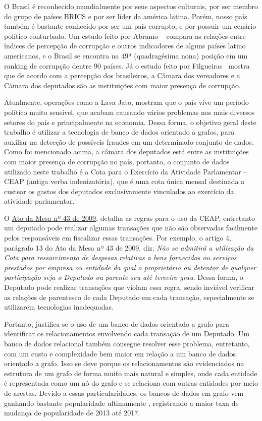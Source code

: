 	
	O Brasil é reconhecido mundialmente por seus aspectos culturais, por ser membro do grupo de países BRICS e por ser líder da américa latina. Porém, nosso país também é bastante conhecido por ser um país corrupto, e por possuir um cenário político conturbado. Um estudo feito por Abramo ~\cite{abramo2000relaccoes} compara as relações entre índices de percepção de corrupção e outros indicadores de alguns países latino americanos, e o Brasil se encontra na 49ª (quadragésima nona) posição em um ranking de corrupção dentre 90 países. Já o estudo feito por Filgueiras~\cite{filgueiras2009tolerancia} mostra que de acordo com a percepção dos brasileiros, a Câmara dos vereadores e a Câmara dos deputados são as instituições com maior presença de corrupção. 
	
	Atualmente, operações como a Lava Jato, mostram que o país vive um período político muito sensível, que acabam causando vários problemas nos mais diversos setores do país e principalmente na economia. Dessa forma, o objetivo geral deste trabalho é utilizar a tecnologia de banco de dados orientado a grafos, para auxiliar na detecção de possíveis fraudes em um determinado conjunto de dados. Como foi mencionado acima, a câmara dos deputados está entre as instituições com maior presença de corrupção no país, portanto, o conjunto de dados utilizado neste trabalho é a Cota para o Exercício da Atividade Parlamentar – CEAP (antiga verba indenizatória), que é uma cota única mensal destinada a custear os gastos dos deputados exclusivamente vinculados ao exercício da atividade parlamentar.
	
	O \href{http://www2.camara.leg.br/legin/int/atomes/2009/atodamesa-43-21-maio-2009-588364-norma-cd-mesa.html}{Ato da Mesa nº 43 de 2009}, detalha as regras para o uso da CEAP, entretanto um deputado pode realizar algumas transações que não são observadas facilmente pelos responsáveis em fiscalizar essas transações. Por exemplo, o artigo 4, parágrafo 13 do Ato da Mesa nº 43 de 2009, diz: \textit{Não se admitirá a utilização da Cota para ressarcimento de despesas relativas  a bens fornecidos ou serviços prestados por empresa ou entidade da qual o proprietário ou detentor de qualquer participação seja o Deputado ou parente seu até terceiro grau}. Dessa forma, o Deputado pode realizar transações que violam essa regra, sendo inviável verificar as relações de parentesco de cada Deputado em cada transação, especialmente se utilizarem tecnologias inadequadas.
	
	Portanto, justifica-se o uso de um banco de dados orientado a grafo para identificar os relacionamentos envolvendo cada transação de um Deputado. Um banco de dados relacional também consegue resolver esse problema, entretanto, com um custo e complexidade bem maior em relação a um banco de dados orientado a grafo. Isso se deve porque os relacionamentos são evidenciados na estrutura de um grafo de forma muito mais natural e simples, onde cada entidade é representada como um nó do grafo e se relaciona com outras entidades por meio de arestas. Devido a essas particularidades, os bancos de dados em grafo vem ganhando bastante popularidade ultimamente \cite{Dbmspopularity}, registrando a maior taxa de mudança de popularidade de 2013 até 2017.
	
